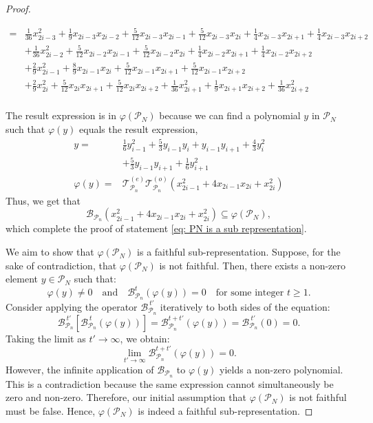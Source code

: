 \documentclass[showpacs,twocolumn,aps,prx,long bibliography,superscriptaddress,notitlepage]{revtex4-1}
\newcommand{\Tcal}{\mathcal{T}}
\begin{document}
\begin{proof}
\begin{widetext}
\begin{equation}
\begin{aligned}
        =& \frac{1}{36}x_{2i-3}^2 + \frac{1}{9} x_{2i-3}x_{2i-2} +\frac{5}{12} x_{2i-3}x_{2i-1}+ \frac{5}{12} x_{2i-3}x_{2i}  + \frac{1}{4} x_{2i-3}x_{2i+1} + \frac{1}{4} x_{2i-3}x_{2i+2}  \\
        &+ \frac{1}{36}x_{2i-2}^2 + \frac{5}{12} x_{2i-2}x_{2i-1}+ \frac{5}{12} x_{2i-2}x_{2i}  + \frac{1}{4} x_{2i-2}x_{2i+1} + \frac{1}{4} x_{2i-2}x_{2i+2}  \\
        &+ \frac{2}{9}x_{2i-1}^2 + \frac{8}{9} x_{2i-1}x_{2i} + \frac{5}{12} x_{2i-1}x_{2i+1} + \frac{5}{12} x_{2i-1}x_{2i+2}\\
        & + \frac{2}{9}x_{2i}^2 + \frac{5}{12} x_{2i}x_{2i+1} + \frac{5}{12} x_{2i}x_{2i+2} + \frac{1}{36}x_{2i+1}^2  + \frac{1}{9} x_{2i+1}x_{2i+2}+ \frac{1}{36}x_{2i+2}^2 \\
    \end{aligned}
    \end{equation}
     \end{widetext}
    The result expression is in $\varphi(\mathcal{P}_N)$ because we can find a polynomial $y$ in $\mathcal{P}_N$ such that $\varphi(y)$ equals the result expression,
    \begin{align}
        y =& \frac{1}{6} y_{i-1}^2 + \frac{5}{3} y_{i-1}y_{i} + y_{i-1}y_{i+1} + \frac{4}{3} y_{i}^2 \nonumber\\
        &+ \frac{5}{3} y_{i-1}y_{i+1}  + \frac{1}{6} y_{i+1}^2 \\
        \varphi(y) =& \Tcal^{(e)}_{\mathcal{P}_n}\Tcal^{(o)}_{\mathcal{P}_n} ( x_{2i-1}^2+4 x_{2i-1} x_{2i}+x_{2i}^2)
    \end{align}
    Thus, we get that 
    \begin{equation}
        \mathcal{B}_{\mathcal{P}_n} ( x_{2i-1}^2+4 x_{2i-1} x_{2i}+x_{2i}^2) \subseteq \varphi(\mathcal{P}_N),
    \end{equation}
    which complete the proof of statement \ref{eq: PN is a sub representation}.

We aim to show that $\varphi(\mathcal{P}_N)$ is a faithful sub-representation. Suppose, for the sake of contradiction, that $\varphi(\mathcal{P}_N)$ is not faithful. Then, there exists a non-zero element $y \in \mathcal{P}_N$ such that:
\[
\varphi(y) \neq 0 \quad \text{and} \quad \mathcal{B}_{\mathcal{P}_n}^t (\varphi(y)) = 0 \quad \text{for some integer } t \geq 1.
\]
Consider applying the operator $\mathcal{B}_{\mathcal{P}_n}^{~t'}$ iteratively to both sides of the equation:
\[
\mathcal{B}_{\mathcal{P}_n}^{~t'} \left[ \mathcal{B}_{\mathcal{P}_n}^{~t} (\varphi(y)) \right] = \mathcal{B}_{\mathcal{P}_n}^{t + t'} (\varphi(y)) = \mathcal{B}_{\mathcal{P}_n}^{~t'} (0) = 0.
\]
Taking the limit as $t' \to \infty$, we obtain:
\[
\lim_{t' \to \infty} \mathcal{B}_{\mathcal{P}_n}^{t + t'} (\varphi(y)) = 0.
\]
However, the infinite application of $\mathcal{B}_{\mathcal{P}_n}$ to $\varphi(y)$ yields a non-zero polynomial.
This is a contradiction because the same expression cannot simultaneously be zero and non-zero. Therefore, our initial assumption that $\varphi(\mathcal{P}_N)$ is not faithful must be false. 
Hence, $\varphi(\mathcal{P}_N)$ is indeed a faithful sub-representation.


\end{proof}
\end{document}
